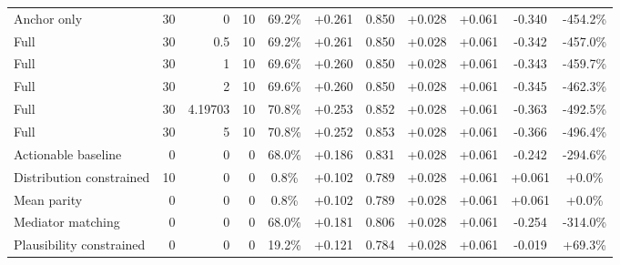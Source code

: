 \begin{table}[htbp]
\begin{tabular}{lrrrccccccc}
Anchor only & 30 & 0 & 10 & 69.2\% & +0.261 & 0.850 & +0.028 & +0.061 & -0.340 & -454.2\% \\
Full & 30 & 0.5 & 10 & 69.2\% & +0.261 & 0.850 & +0.028 & +0.061 & -0.342 & -457.0\% \\
Full & 30 & 1 & 10 & 69.6\% & +0.260 & 0.850 & +0.028 & +0.061 & -0.343 & -459.7\% \\
Full & 30 & 2 & 10 & 69.6\% & +0.260 & 0.850 & +0.028 & +0.061 & -0.345 & -462.3\% \\
Full & 30 & 4.19703 & 10 & 70.8\% & +0.253 & 0.852 & +0.028 & +0.061 & -0.363 & -492.5\% \\
Full & 30 & 5 & 10 & 70.8\% & +0.252 & 0.853 & +0.028 & +0.061 & -0.366 & -496.4\% \\
Actionable baseline & 0 & 0 & 0 & 68.0\% & +0.186 & 0.831 & +0.028 & +0.061 & -0.242 & -294.6\% \\
Distribution constrained & 10 & 0 & 0 & 0.8\% & +0.102 & 0.789 & +0.028 & +0.061 & +0.061 & +0.0\% \\
Mean parity & 0 & 0 & 0 & 0.8\% & +0.102 & 0.789 & +0.028 & +0.061 & +0.061 & +0.0\% \\
Mediator matching & 0 & 0 & 0 & 68.0\% & +0.181 & 0.806 & +0.028 & +0.061 & -0.254 & -314.0\% \\
Plausibility constrained & 0 & 0 & 0 & 19.2\% & +0.121 & 0.784 & +0.028 & +0.061 & -0.019 & +69.3\% \\
\bottomrule
\end{tabular}
\end{table}
